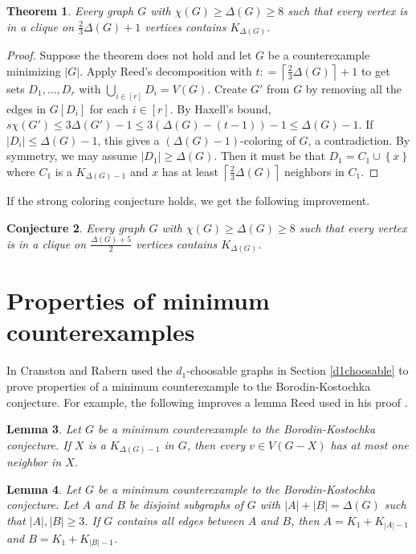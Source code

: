 \documentclass[12pt]{article}
\theoremstyle{plain}
\newtheorem{thm}{Theorem}
\newtheorem{lem}[thm]{Lemma}
\newtheorem{conjecture}[thm]{Conjecture}
\theoremstyle{definition}
\theoremstyle{remark}
\newcommand{\set}[1]{\left\{ #1 \right\}}
\newcommand{\card}[1]{\left|#1\right|}
\newcommand{\ceil}[1]{\left\lceil#1\right\rceil}
\newcommand{\irange}[1]{\left[#1\right]}
\newcommand{\parens}[1]{\left( #1 \right)}
\newcommand{\DefinedAs}{\mathrel{\mathop:}=}
\begin{document}
\begin{thm}\label{TwoThirdsCliqueCorImproved}
Every graph $G$ with $\chi(G) \ge \Delta(G) \ge 8$ such that every
vertex is in a clique on $\frac23\Delta(G) + 1$ vertices contains $K_{\Delta(G)}$.
\end{thm}
\begin{proof}
Suppose the theorem does not hold and let $G$ be a counterexample minimizing $\card{G}$.  
Apply Reed's decomposition with $t \DefinedAs \ceil{\frac23\Delta(G)} + 1$ to get sets $D_1, \ldots, D_r$ with $\bigcup_{i\in\irange{r}} D_i = V(G)$.  
Create $G'$ from $G$ by removing all the edges in $G[D_i]$ for each $i \in \irange{r}$.  
By Haxell's bound, $s\chi(G') \le 3\Delta(G') - 1 \le 3(\Delta(G) - (t-1)) - 1 \le \Delta(G)-1$. If $\card{D_i} \le \Delta(G)- 1$, this gives
a $\parens{\Delta(G)-1}$-coloring of $G$, a contradiction.  By symmetry, we may assume $\card{D_1} \ge \Delta(G)$.  Then it must be that $D_1 = C_1 \cup \set{x}$ where
$C_1$ is a $K_{\Delta(G)-1}$ and $x$ has at least $\ceil{\frac23\Delta(G)}$ neighbors in $C_1$.
\end{proof}

If the strong coloring conjecture holds, we get the following improvement.

\begin{conjecture}\label{TwoThirdsCliqueCorImprovedMore}
Every graph $G$ with $\chi(G) \ge \Delta(G) \ge 8$ such that every
vertex is in a clique on $\frac{\Delta(G) + 5}{2}$ vertices contains $K_{\Delta(G)}$.
\end{conjecture}

\section{Properties of minimum counterexamples}\label{mules}
In \cite{cranstonrabernapriori} Cranston and Rabern used the $d_1$-choosable graphs in Section \ref{d1choosable} to prove properties 
of a minimum counterexample to the Borodin-Kostochka conjecture.  For example, the following improves a lemma Reed used in his proof \cite{reed1999strengthening}.

\begin{lem}
Let $G$ be a minimum counterexample to the Borodin-Kostochka conjecture.  If $X$ is a $K_{\Delta(G) - 1}$ in $G$, then every $v \in V(G-X)$ has at most one neighbor in $X$.
\end{lem}

\begin{lem}
Let $G$ be a minimum counterexample to the Borodin-Kostochka conjecture. Let $A$ and $B$ be disjoint subgraphs of $G$ with $\card{A} + \card{B} = \Delta(G)$ 
such that $\card{A},\card{B} \ge 3$.  If $G$ contains all edges between $A$ and $B$,
then $A = K_1 + K_{\card{A} - 1}$ and $B = K_1 + K_{\card{B} - 1}$.
\end{lem}
\end{document}

